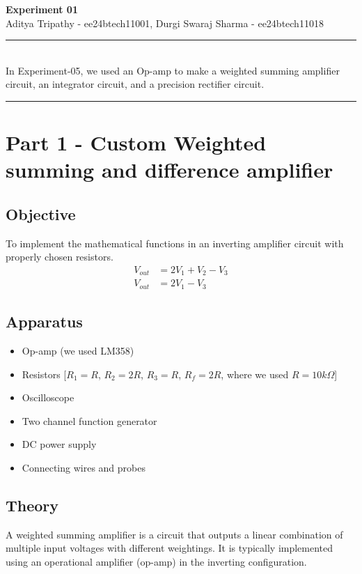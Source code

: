 \documentclass[a4paper,12pt]{article}
\renewenvironment{abstract}
 {\par\noindent\textbf{\abstractname}\ \ignorespaces \\}
 {\par\noindent\medskip}
\begin{document}
\pagestyle{fancy}
\thispagestyle{empty}
\fancyhead[L]{}
\renewcommand*{\thefootnote}{\fnsymbol{footnote}}
\begin{center}
\Large{\textbf{Experiment 01}}
\vspace{0.4cm}
\normalsize
\\ Aditya Tripathy - ee24btech11001, Durgi Swaraj Sharma - ee24btech11018\\
\medskip
\normalsize
\end{center}
{\color{gray}\hrule}
\vspace{0.4cm}
\begin{abstract}
In Experiment-05, we used an Op-amp to make a weighted summing amplifier circuit, an integrator circuit, and a precision rectifier circuit.
\end{abstract}
{\color{gray}\hrule}
\medskip
\section{Part 1 - Custom Weighted summing and difference amplifier}
\subsection{Objective}
To implement the mathematical functions in an inverting amplifier circuit with properly chosen resistors.
\begin{align*}
	V_{out} &= 2V_1+V_2-V_3\\
	V_{out} &= 2V_1-V_3
\end{align*}
\subsection{Apparatus}
\begin{itemize}
	\item Op-amp (we used LM358)
	\item Resistors [$R_1=R$, $R_2=2R$, $R_3=R$, $R_f=2R$, where we used $R = 10k\Omega$]
	\item Oscilloscope
	\item Two channel function generator
	\item DC power supply	
	\item Connecting wires and probes
\end{itemize}
\subsection{Theory}
A weighted summing amplifier is a circuit that outputs a linear combination of multiple input voltages with different weightings. It is typically implemented using an operational amplifier (op-amp) in the inverting configuration.
\end{document}
